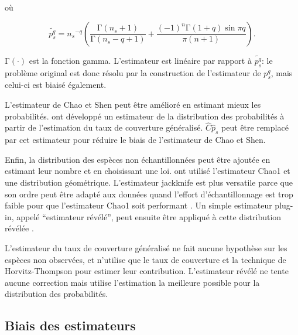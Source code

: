 \documentclass[
  11pt,
  french,
  a4paper,
  extrafontsizes,onecolumn,openright
  ]{memoir}
\begin{document}
où

\begin{equation}
  \label{eq:Estpqs}
  \widetilde{p^q_s}
  = {n_s}^{-q} \left(
    \frac{\mathrm{\Gamma}\left(n_s +1\right)}{\mathrm{\Gamma}\left(n_s -q+1\right)}
    + \frac{{\left(-1\right)}^n \mathrm{\Gamma}\left(1+q\right)\sin{\pi q}}{\pi\left(n+1\right)}  \right).
\end{equation}

\(\mathrm{\Gamma}\left(\cdot\right)\) est la fonction gamma.
L'estimateur est linéaire par rapport à \(\widetilde{p^q_s}\): le problème original est donc résolu par la construction de l'estimateur de \(p^q_s\), mais celui-ci est biaisé également.

L'estimateur de Chao et Shen peut être amélioré \autocite{Marcon2015a} en estimant mieux les probabilités.
\textcite{Chao2014c} ont développé un estimateur de la distribution des probabilités à partir de l'estimation du taux de couverture généralisé.
\(\hat{C}{\hat{p}}_s\) peut être remplacé par cet estimateur pour réduire le biais de l'estimateur de Chao et Shen.

Enfin, la distribution des espèces non échantillonnées peut être ajoutée en estimant leur nombre et en choisissant une loi.
\textcite{Chao2014c} ont utilisé l'estimateur Chao1 et une distribution géométrique.
L'estimateur jackknife \autocite{Burnham1979} est plus versatile parce que son ordre peut être adapté aux données quand l'effort d'échantillonnage est trop faible pour que l'estimateur Chao1 soit performant \autocite{Brose2003}.
Un simple estimateur plug-in, appelé ``estimateur révélé'', peut ensuite être appliqué à cette distribution révélée \autocite{Marcon2015a}.

L'estimateur du taux de couverture généralisé ne fait aucune hypothèse sur les espèces non observées, et n'utilise que le taux de couverture et la technique de Horvitz-Thompson pour estimer leur contribution.
L'estimateur révélé ne tente aucune correction mais utilise l'estimation la meilleure possible pour la distribution des probabilités.

\hypertarget{biais-des-estimateurs}{%
\subsection{Biais des estimateurs}\label{biais-des-estimateurs}}
\end{document}
